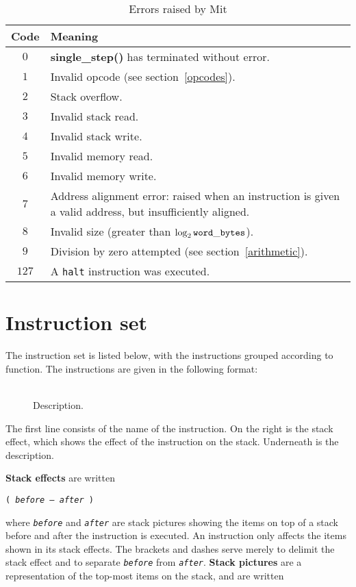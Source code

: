 \documentclass[a4paper]{article}
\newcommand{\spic}[1]{\texttt{\textsl{#1\/}}}
\newlength{\itemwidth}\itemwidth=\textwidth \advance\itemwidth by -0.1in
\newlength{\instname}\instname=1.5in
\newlength{\stackcom}\stackcom=3.0in
\newcommand{\inst}[3]{\item[]\parbox{\itemwidth}%
{\makebox[\instname][l]{\tt #1}%
\makebox[\stackcom][r]{\tt ( \spic{#2} )}\\[0.5ex]#3}}
\begin{document}
\begin{table}[htbp]
\begin{center}
\begin{tabular}{cp{4in}} \toprule
\bf Code & \bf Meaning \\ \midrule
$0$ & {\bf single\_step()} has terminated without error. \\
$1$ & Invalid opcode (see section~\ref{opcodes}). \\
$2$ & Stack overflow. \\
$3$ & Invalid stack read. \\
$4$ & Invalid stack write. \\
$5$ & Invalid memory read. \\
$6$ & Invalid memory write. \\
$7$ & Address alignment error: raised when an instruction is given a valid address, but insufficiently aligned. \\
$8$ & Invalid size (greater than $\log_2{\tt word\_bytes}$). \\
$9$ & Division by zero attempted (see section~\ref{arithmetic}). \\
$127$ & A {\tt halt} instruction was executed. \\
 \bottomrule
\end{tabular}
\caption{\label{errortable}Errors raised by Mit}
\end{center}
\end{table}


\section{Instruction set}
\label{instset}

The instruction set is listed below,
with the instructions grouped according to function. The
instructions are given in the following format:

\begin{description}
\inst{NAME}{before — after}{Description.}
\end{description}

The first line consists of the name of the instruction. On the right is the
stack effect, which shows the effect of the instruction on the stack.
Underneath is the description.

{\bf Stack effects} are written

\centerline{\tt ( \spic{before — after} )}

\noindent where \spic{before} and \spic{after} are stack pictures showing the items on top
of a stack before and after the instruction is executed.
An instruction only affects the items shown in its
stack effects. The brackets and dashes serve merely to delimit the stack
effect and to separate \spic{before} from \spic{after}. {\bf Stack pictures}
are a representation of the top-most items on the stack, and are written
\end{document}
